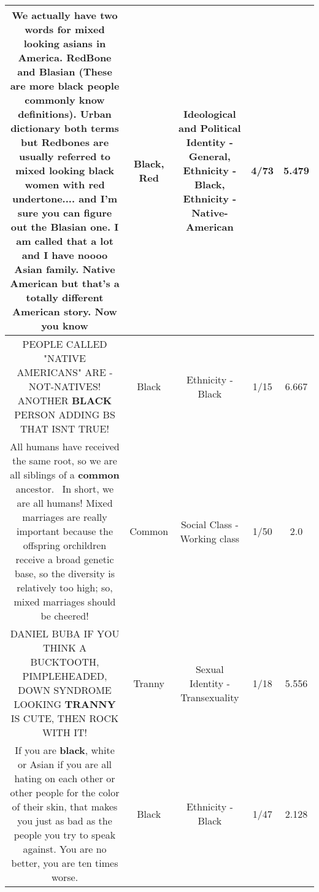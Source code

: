 \documentclass[11pt]{article}
\newlength\mylength
\begin{document}
\begin{center}
\begin{longtable}{|C{.65\mylength}|C{.30\mylength}|C{.12\mylength}|C{.12\mylength}|C{.12\mylength}|}
  \small We actually have two words for mixed looking asians in America. RedBone and Blasian (These are more \textbf{black} people commonly know definitions). Urban dictionary both terms but Redbones are usually referred to mixed looking \textbf{black} women with \textbf{r\textbf{ed}} undertone.... and I'm sure you can figure out the Blasian one. I am called that a lot and I have noooo Asian family. Native American but that's a totally different American story. Now you know\normalsize   & Black, Red &  Ideological and Political Identity - General, Ethnicity - Black, Ethnicity - Native-American & 4/73 & 5.479 \\  \hline
  \small PEOPLE CALLED "NATIVE AMERICANS" ARE - NOT-NATIVES! ANOTHER \textbf{BLACK} PERSON ADDING BS THAT ISNT TRUE!\normalsize   & Black & Ethnicity - Black & 1/15 & 6.667 \\  \hline
  \small All humans have received the same root, so we are all siblings of a \textbf{common} ancestor.  In short, we are all humans! Mixed marriages are really important because the offspring orchildren receive a broad genetic base, so the diversity is relatively too high; so, mixed marriages should be cheered!\normalsize   & Common & Social Class - Working class & 1/50 & 2.0 \\  \hline
  \small DANIEL BUBA IF YOU THINK A BUCKTOOTH, PIMPLEHEADED, DOWN SYNDROME LOOKING \textbf{TRANNY} IS CUTE, THEN ROCK WITH IT!\normalsize   & Tranny & Sexual Identity - Transexuality & 1/18 & 5.556 \\  \hline
  \small If you are \textbf{black}, white or Asian if you are all hating on each other or other people for the color of their skin, that makes you just as bad as the people you try to speak against. You are no better, you are ten times worse.\normalsize   & Black & Ethnicity - Black & 1/47 & 2.128 \\  \hline

\end{longtable}
\end{center}
\end{document}
